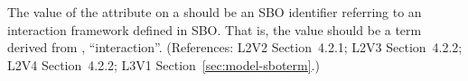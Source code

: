 The value of the  attribute on a \Model should be
an SBO identifier referring to an interaction framework defined
in SBO.  That is, the value should be a term derived from
\sbointeractionID, ``interaction''.  (References: L2V2
Section~4.2.1; L2V3 Section~4.2.2; L2V4 Section~4.2.2; L3V1 Section~\ref{sec:model-sboterm}.)
